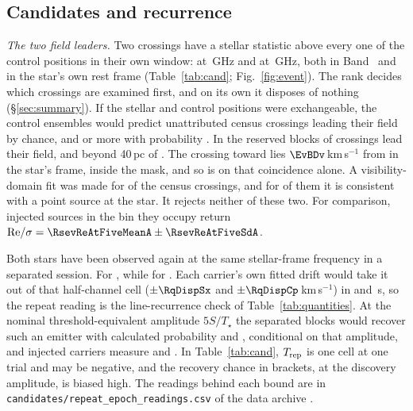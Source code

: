 \subsection{Candidates and recurrence}
\label{sec:etacrv}

\label{sec:vistest}%
\emph{The two field leaders.} Two crossings have a stellar statistic above
every one of the \NCtrl{} control positions in their own window: \EvAStar{}
at \RqFreqSx\,GHz and \EvBStar{} at \RqFreqCp\,GHz, both in Band~\EvABand{}
and in the star's own rest frame (Table~\ref{tab:cand};
Fig.~\ref{fig:event}). The rank decides which crossings are examined first,
and on its own it disposes of nothing (\S\ref{sec:summary}). If the stellar
and control positions were exchangeable, the control ensembles would predict
\RkCondExp{} unattributed census crossings leading their field by chance,
and \RkCondNObsWord{} or more with probability \RkCondProb. In the reserved
blocks \RkHoLead{} of \RkHoN{} crossings lead their field, and beyond 40\,pc
\RkOosLead{} of \RkOosN. The crossing toward \EvBStar{} lies
$\EvBDv$\,km\,s$^{-1}$ from \EvBLine{} in the star's frame, inside the mask,
and so is \EvBDispo{} on that coincidence alone. A visibility-domain fit
was made for \CsNVisFit{} of the \CsNCross{} census crossings, and for
\CsNVisLocal{} of them it is consistent with a point source at the star. It
rejects neither of these two. For comparison, injected sources in the bin
they occupy return ${\rm Re}/\sigma=
\RsevReAtFiveMeanA\pm\RsevReAtFiveSdA$.

Both stars have been observed again at the same stellar-frame frequency in a
separated session. For \EvAStar{} \RcSxSepClause, while for \EvBStar{}
\RcCpSepClause. Each carrier's own fitted drift would take it out of that
half-channel cell ($\pm\RqDispSx$ and $\pm\RqDispCp$\,km\,s$^{-1}$) in
\ZtSxLeaveSec{} and \ZtCpLeaveSec\,s, so the repeat reading is the
line-recurrence check of Table~\ref{tab:quantities}. At the nominal
threshold-equivalent amplitude $5S/T_\star$ the separated blocks would
recover such an emitter with calculated probability \RcSxPowerTrig{} and
\RcCpPowerTrig, conditional on that amplitude, and injected carriers measure
\HjMeasSx{} and \HjMeasCp. In Table~\ref{tab:cand}, $T_{\rm rep}$ is one cell
at one trial and may be negative, and the recovery chance in brackets, at the
discovery amplitude, is biased high. The readings behind each bound are in
\texttt{candidates/repeat\_epoch\_readings.csv} of the data archive
\citep{SIdeposit}.


